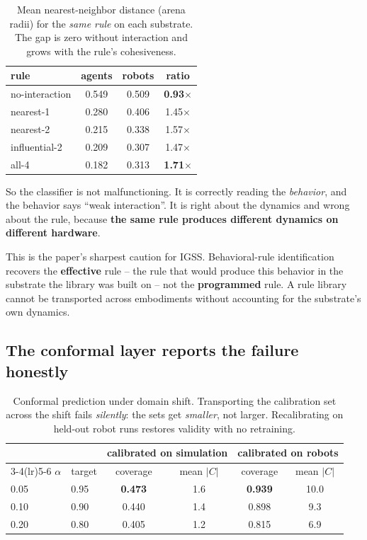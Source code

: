 \documentclass[11pt]{article}
\begin{document}
\begin{table}[t]
\centering
\small
\caption{Mean nearest-neighbor distance (arena radii) for the \emph{same rule} on
each substrate. The gap is zero without interaction and grows with the rule's
cohesiveness.}
\label{tab:cohesion}
\begin{tabular}{lccc}
\toprule
rule & agents & robots & ratio \\
\midrule
no-interaction & 0.549 & 0.509 & \textbf{0.93$\times$} \\
nearest-1      & 0.280 & 0.406 & 1.45$\times$ \\
nearest-2      & 0.215 & 0.338 & 1.57$\times$ \\
influential-2  & 0.209 & 0.307 & 1.47$\times$ \\
all-4          & 0.182 & 0.313 & \textbf{1.71$\times$} \\
\bottomrule
\end{tabular}
\end{table}

So the classifier is not malfunctioning. It is correctly reading the \emph{behavior},
and the behavior says ``weak interaction''. It is right about the dynamics and wrong
about the rule, because \textbf{the same rule produces different dynamics on different
hardware}.

This is the paper's sharpest caution for IGSS. Behavioral-rule identification recovers
the \textbf{effective} rule -- the rule that would produce this behavior in the
substrate the library was built on -- not the \textbf{programmed} rule. A rule library
cannot be transported across embodiments without accounting for the substrate's own
dynamics.

\subsection{The conformal layer reports the failure honestly}

\begin{table}[t]
\centering
\small
\caption{Conformal prediction under domain shift. Transporting the calibration set
across the shift fails \emph{silently}: the sets get \emph{smaller}, not larger.
Recalibrating on held-out robot runs restores validity with no retraining.}
\label{tab:robot-conformal}
\begin{tabular}{llcccc}
\toprule
 & & \multicolumn{2}{c}{calibrated on \textbf{simulation}}
   & \multicolumn{2}{c}{calibrated on \textbf{robots}} \\
\cmidrule(lr){3-4}\cmidrule(lr){5-6}
$\alpha$ & target & coverage & mean $|C|$ & coverage & mean $|C|$ \\
\midrule
0.05 & 0.95 & \textbf{0.473} & 1.6 & \textbf{0.939} & 10.0 \\
0.10 & 0.90 & 0.440 & 1.4 & 0.898 & 9.3 \\
0.20 & 0.80 & 0.405 & 1.2 & 0.815 & 6.9 \\
\bottomrule
\end{tabular}
\end{table}
\end{document}
